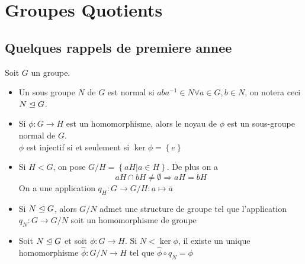 \documentclass[../main.tex]{subfiles}
\begin{document}
\section{Groupes Quotients}
\subsection{Quelques rappels de premiere annee}
Soit $G$ un groupe.\\
\begin{itemize}
\item Un sous groupe $N$ de $G$ est normal si $aba^{-1}\in N \forall a \in G, b \in N$, on notera ceci $N \trianglelefteq G$.
\item Si $\phi: G \to H$ est un homomorphisme, alors le noyau de $\phi$ est un sous-groupe normal de $G$.\\
$\phi$ est injectif si et seulement si $\ker\phi= \left\{ e  \right\} $
\item Si $H < G$, on pose $ G /H= \left\{ aH | a \in H \right\} $. De plus on a 
	\[ 
	aH \cap bH\neq \emptyset \Rightarrow aH=bH
	\]
On a une application $q_H: G \to G /H: a \mapsto \overline{a}$ 
\item Si $N \trianglelefteq G$, alors $G/N$ admet une structure de groupe tel que l'application $q_N: G \to G /N$ soit un homomorphisme de groupe
\item Soit $ N \trianglelefteq G$ et soit $\phi: G \to H$. Si $N < \ker\phi$, il existe un unique homomorphisme $ \hat{\phi}: G /N\to H$ tel que $\hat{\phi}\circ q_N= \phi$
\end{itemize}
\end{document}
